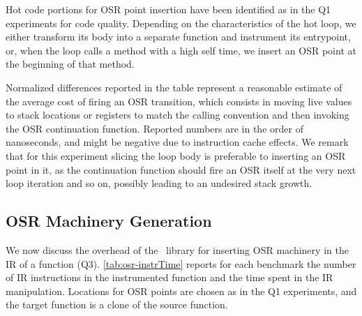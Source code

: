 \noindent Hot code portions for OSR point insertion have been identified as in the Q1 experiments for code quality. Depending on the characteristics of the hot loop, we either transform its body into a separate function and instrument its entrypoint, or, when the loop calls a method with a high self time, we insert an OSR point at the beginning of that method.

Normalized differences reported in the table represent a reasonable estimate of the average cost of firing an OSR transition, which consists in moving live values to stack locations or registers to match the calling convention and then invoking the OSR continuation function.
Reported numbers are in the order of nanoseconds, and might be negative due to instruction cache effects. We remark that for this experiment slicing the loop body is preferable to inserting an OSR point in it, as the continuation function should fire an OSR itself at the very next loop iteration and so on, possibly leading to an undesired stack growth.

\subsection{OSR Machinery Generation}

We now discuss the overhead of the \osrkit\ library for inserting OSR machinery in the IR of a function (Q3). \mytable\ref{tab:osr-instrTime} reports for each benchmark the number of IR instructions in the instrumented function and the time spent in the IR manipulation. Locations for OSR points are chosen as in the Q1 experiments, and the target function is a clone of the source function.

